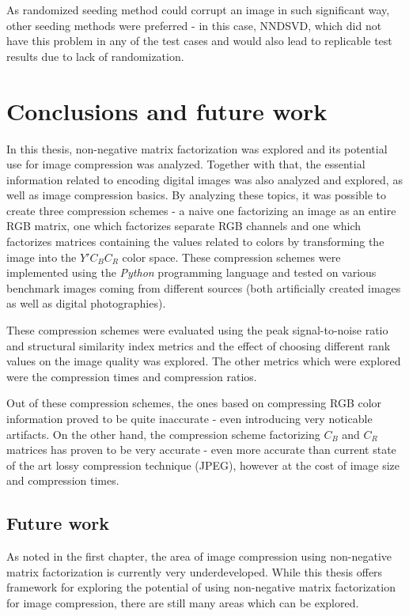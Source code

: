 \documentclass[thesis=M,english]{FITthesis}[2012/10/20]
\begin{document}
As randomized seeding method could corrupt an image in such significant way, other seeding
methods were preferred - in this case, NNDSVD, which did not have this problem in any of the
test cases and would also lead to replicable test results due to lack of randomization.


\chapter{Conclusions and future work}
In this thesis, non-negative matrix factorization was explored and its potential
use for image compression was analyzed. Together with that, the essential information
related to encoding digital images was also analyzed and explored, as well as image
compression basics. By analyzing these topics, it was possible to create three compression schemes
- a naive one factorizing an image as an entire RGB matrix,
one which factorizes separate RGB channels and one which factorizes matrices containing
the values related to colors by transforming the image into the $Y'C_BC_R$ color space.
These compression schemes were implemented using the \emph{Python} programming language
and tested on various benchmark images coming from different sources (both artificially
created images as well as digital photographies).

These compression schemes were evaluated using the peak signal-to-noise ratio and structural
similarity index metrics and the effect of choosing different rank values on the image quality
was explored. The other metrics which were explored were the compression times and compression ratios.

Out of these compression schemes, the ones based on compressing RGB color information
proved to be quite inaccurate - even introducing very noticable artifacts. On the other hand,
the compression scheme factorizing $C_B$ and $C_R$ matrices has proven to be very accurate - even
more accurate than current state of the art lossy compression technique (JPEG), however at the cost
of image size and compression times. 

\section{Future work}
As noted in the first chapter, the area of image compression using non-negative matrix
factorization is currently very underdeveloped. While this thesis offers framework
for exploring the potential of using non-negative matrix factorization for
image compression, there are still many areas which can be explored.
\end{document}
